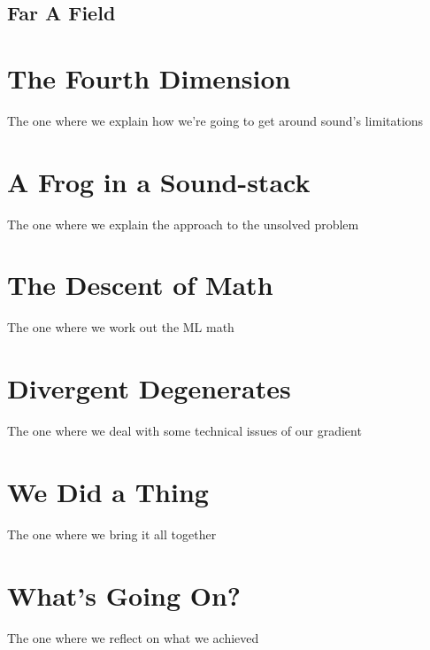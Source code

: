 \documentclass[10pt,a4paper]{article}
\begin{document}
\subsection{Far A Field}
\section{The Fourth Dimension}
The one where we explain how we're going to get around sound's limitations
\section{A Frog in a Sound-stack}
The one where we explain the approach to the unsolved problem
\section{The Descent of Math}
The one where we work out the ML math
\section{Divergent Degenerates}
The one where we deal with some technical issues of our gradient
\section{We Did a Thing}
The one where we bring it all together
\section{What's Going On?}
The one where we reflect on what we achieved
\newpage


\end{document}
